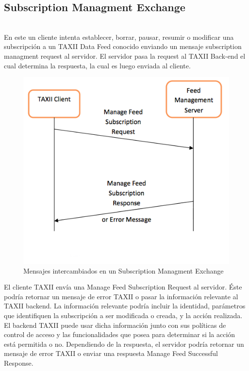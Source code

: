 \subsection{Subscription Managment Exchange}\ \\

En este un cliente intenta establecer, borrar, pausar, resumir o modificar una 
subscripción a un TAXII Data Feed conocido enviando un mensaje subscription 
managment request al servidor. El servidor pasa la request al TAXII Back-end el 
cual determina la respuesta, la cual es luego enviada al cliente.

\begin{figure}[ht!]
  \centering
    \includegraphics[width=150mm]{./images/SubscriptionManagmentExchange.png}
    \caption{Mensajes intercambiados en un Subscription Managment Exchange \protect\cite{b1}} 
\end{figure}

El cliente TAXII envía una Manage Feed Subscription Request al servidor. Éste 
podría retornar un mensaje de error TAXII o pasar la información relevante al 
TAXII backend. La información relevante podría incluir la identidad, parámetros 
que identifiquen la subscripción a ser modificada o creada, y la acción 
realizada. El backend TAXII puede usar dicha información junto con sus 
políticas de control de acceso y las funcionalidades que posea para determinar 
si la acción está permitida o no. Dependiendo de la respuesta, el servidor 
podría retornar un mensaje de error TAXII o enviar una respuesta Manage Feed 
Successful Response.

